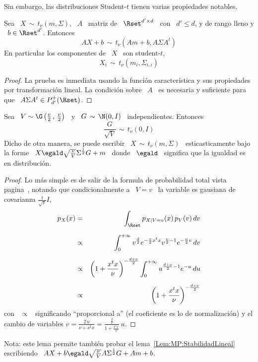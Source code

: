 Sin embargo, las distribuciones Student-$t$ tienen varias propiedades notables.

\begin{lema}
\label{Lem:MP:StabilidadLineal}
%
  Sea \ $X  \, \sim \, t_\nu(m,\Sigma)$,  \ $A$ \ matriz de  \ $\Rset^{d' \times
    d}$ \ con \ $d' \le d$, y de rango lleno y \ $b \in \Rset^{d'}$. Entonces
  \[
  A X + b\, \sim \, t_\nu( A m + b , A \Sigma A^t)
  \]
  En particular los componentes de \ $X$ \ son student-$t$,
  \[
  X_i \, \sim \, t_\nu(m_i , \Sigma_{i,i} )
  \]
\end{lema}
\begin{proof}
  La prueba es inmediata usando  la funci\'on caracter\'istica y sus propiedades
  por  transformaci\'on lineal.  La condici\'on  sobre \  $A$ \  es  necesaria y
  suficiente para que \ $A \Sigma A^t \in P_{d'}^+(\Rset)$.
\end{proof}

\begin{lema}
\label{Lem:MP:MezclaGaussianaEscalaStudent}
%
  Sea \ $V \sim \G\left( \frac{\nu}{2} \, ,  \, \frac{\nu}{2} \right)$ \ y \ $G \, \sim \,
  \N(0,I)$ \ independientes. Entonces
  \[
  \frac{G}{\sqrt{V}} \, \sim \, t_\nu( 0 , I )
  \]
  Dicho de  otra manera, se  puede escribir \  $X \, \sim \,  t_\nu(m,\Sigma)$ \
  esticasticamente   bajo   la    forme   \   $X   \egald   \sqrt{\frac{\nu}{V}}
  \Sigma^{\frac12} G + m $ \ donde  \ $\egald$ \ significa que la igualdad es en
  distribuci\'on.
\end{lema}
\begin{proof}
  Lo  m\'as  simple es  de  salir  de la  formula  de  probabilidad total  vista
  pagina~\pageref{:MP:}, notando que condicionalmente a \ $V=v$ \ la variable es
  gausiana de covarianza $\frac{1}{\sqrt{v}} I$,
%
\begin{eqnarray*}
p_X(x) & = & \int_\Rset p_{X|V=v}(x) \, p_V(v) \, dv\\[2mm]
%
& \propto & \int_0^{+\infty} v^{\frac{d}{2}} e^{-\frac{v}{2} x^t x}
v^{\frac{\nu}{2}-1} e^{-\frac{\nu}{2} v} \, dv\\[2mm]
%
& \propto & \left( 1 + \frac{x^t x}{\nu} \right)^{- \frac{d+\nu}{2}}
\int_0^{+\infty} u^{\frac{d+\nu}{2}-1} e^{-u} \, du\\[2mm]
%
& \propto & \left( 1 + \frac{x^t x}{\nu} \right)^{- \frac{d+\nu}{2}}
\end{eqnarray*}
%
con  \ $\propto$  \ significando  ``proporcional a''  (el coeficiente  es  lo de
normalizaci\'on) y  el cambio de  variables $v  = \frac{2 \,  u}{\nu + x^t  x} =
\frac{\frac{2}{\nu}}{1 + \frac{x^t x}{\nu}} \, u$.
\end{proof}
%
Nota: este  lema permite tambi\'en  probar el lema~\ref{Lem:MP:StabilidadLineal}
escribiendo \ $A X + b \egald  \sqrt{\frac{\nu}{V}} A \Sigma^{\frac12} G + A m +
b$.

